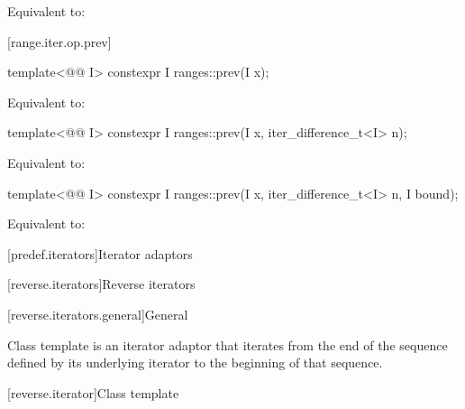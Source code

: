 \begin{itemdescr}
\pnum
\effects
Equivalent to: 
\end{itemdescr}

[range.iter.op.prev]{}
%
\begin{itemdecl}
template<@@ I>
  constexpr I ranges::prev(I x);
\end{itemdecl}

\begin{itemdescr}
\pnum
\effects
Equivalent to: 
\end{itemdescr}

%
\begin{itemdecl}
template<@@ I>
  constexpr I ranges::prev(I x, iter_difference_t<I> n);
\end{itemdecl}

\begin{itemdescr}
\pnum
\effects
Equivalent to: 
\end{itemdescr}

%
\begin{itemdecl}
template<@@ I>
  constexpr I ranges::prev(I x, iter_difference_t<I> n, I bound);
\end{itemdecl}

\begin{itemdescr}
\pnum
\effects
Equivalent to: 
\end{itemdescr}

[predef.iterators]{Iterator adaptors}

[reverse.iterators]{Reverse iterators}

[reverse.iterators.general]{General}

\pnum
Class template  is an iterator adaptor that iterates from the end of the sequence defined by its underlying iterator to the beginning of that sequence.

[reverse.iterator]{Class template }

